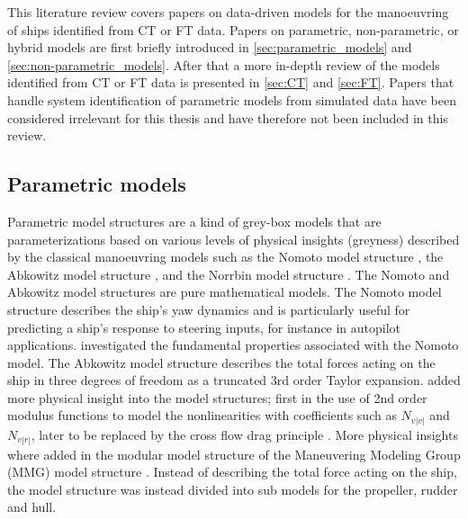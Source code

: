 This literature review covers papers on data-driven models for the manoeuvring of ships identified from CT or FT data. Papers on parametric, non-parametric, or hybrid models are first briefly introduced in \autoref{sec:parametric_models} and \ref{sec:non-parametric_models}. After that a more in-depth review of the models identified from CT or FT data is presented in \autoref{sec:CT} and \ref{sec:FT}.
Papers that handle system identification of parametric models from simulated data have been considered irrelevant for this thesis and have therefore not been included in this review. 

\subsection{Parametric models} \label{sec:parametric_models}
Parametric model structures are a kind of grey-box models that are parameterizations based on various levels of physical insights (greyness) described by the classical manoeuvring models such as the Nomoto model structure \cite{nomotoSteeringQualitiesShips1957}, the Abkowitz model structure \cite{abkowitzShipHydrodynamicsSteering1964}, and the Norrbin model structure \cite{norrbinTheoryObservationsUse1971}. The Nomoto and Abkowitz model structures are pure mathematical models. The Nomoto model structure describes the ship's yaw dynamics and is particularly useful for predicting a ship's response to steering inputs, for instance in autopilot applications. \textcite{tzengFUNDAMENTALPROPERTIESLINEAR1999} investigated the fundamental properties associated with the Nomoto model. The Abkowitz model structure describes the total forces acting on the ship in three degrees of freedom as a truncated 3rd order Taylor expansion. \textcite{norrbinTheoryObservationsUse1971} added more physical insight into the model structures; first in the use of 2nd order modulus functions  to model the nonlinearities with coefficients such as $N_{v|v|}$ and $N_{v|r|}$, later to be replaced by the cross flow drag principle \cite{fossenHandbookMarineCraft2011}. More physical insights where added in the modular model structure of the Maneuvering Modeling Group (MMG) model structure \cite{ogawaMathematicalModelManoeuvring1978,inouePracticalCalculationMethod1981,yasukawaIntroductionMMGStandard2015}. Instead of describing the total force acting on the ship, the model structure was instead divided into sub models for the propeller, rudder and hull.

